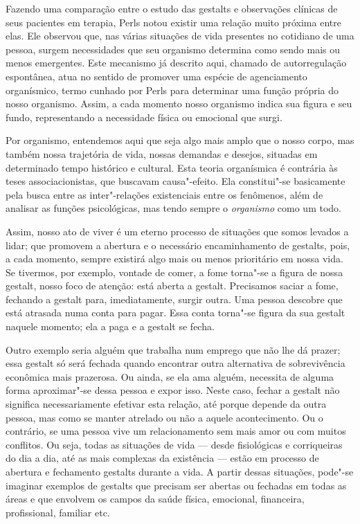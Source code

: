 Fazendo uma comparação entre o estudo das gestalts e observações
clínicas de seus pacientes em terapia, Perls notou existir uma relação
muito próxima entre elas. Ele observou que, nas várias situações de vida
presentes no cotidiano de uma pessoa, surgem necessidades que seu
organismo determina como sendo mais ou menos emergentes. Este mecanismo
já descrito aqui, chamado de autorregulação espontânea, atua no sentido
de promover uma espécie de agenciamento organísmico, termo cunhado por
Perls para determinar uma função própria do nosso organismo. Assim, a
cada momento nosso organismo indica sua figura e seu fundo,
representando a necessidade física ou emocional que surgi.

Por organismo, entendemos aqui que seja algo mais amplo que o nosso
corpo, mas também nossa trajetória de vida, nossas demandas e desejos,
situadas em determinado tempo histórico e cultural. Esta teoria
organísmica é contrária às teses associacionistas, que buscavam
causa"-efeito. Ela constitui"-se basicamente pela busca entre as
inter"-relações existenciais entre os fenômenos, além de analisar as
funções psicológicas, mas tendo sempre o \emph{organismo} como um todo.

Assim, nosso ato de viver é um eterno processo de situações que somos
levados a lidar; que promovem a abertura e o necessário encaminhamento
de gestalts, pois, a cada momento, sempre existirá algo mais ou menos
prioritário em nossa vida. Se tivermos, por exemplo, vontade de comer, a
fome torna"-se a figura de nossa gestalt, nosso foco de atenção: está
aberta a gestalt. Precisamos saciar a fome, fechando a gestalt para,
imediatamente, surgir outra. Uma pessoa descobre que está atrasada numa
conta para pagar. Essa conta torna"-se figura da sua gestalt naquele
momento; ela a paga e a gestalt se fecha.

Outro exemplo seria alguém que trabalha num emprego que não lhe dá
prazer; essa gestalt só será fechada quando encontrar outra alternativa
de sobrevivência econômica mais prazerosa. Ou ainda, se ela ama alguém,
necessita de alguma forma aproximar"-se dessa pessoa e expor isso. Neste
caso, fechar a gestalt não significa necessariamente efetivar esta
relação, até porque depende da outra pessoa, mas como se manter atrelado
ou não a aquele acontecimento. Ou o contrário, se uma pessoa vive um
relacionamento sem mais amor ou com muitos conflitos. Ou seja, todas as
situações de vida --- desde fisiológicas e corriqueiras do dia a dia, até
as mais complexas da existência --- estão em processo de abertura e
fechamento gestalts durante a vida. A partir dessas situações, pode"-se
imaginar exemplos de gestalts que precisam ser abertas ou fechadas em
todas as áreas e que envolvem os campos da saúde física, emocional,
financeira, profissional, familiar etc.


